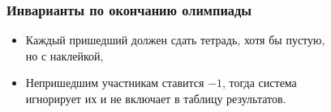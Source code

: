\documentclass[aspectratio=1610,12pt,notheorems]{beamer}
\begin{document}
\begin{frame} \frametitle{Инварианты по окончанию олимпиады}
\begin{itemize}
	\item Каждый пришедший должен сдать тетрадь, хотя бы пустую, \\
	но с наклейкой, \medskip
	\item Непришедшим участникам ставится $-1$, тогда система \\
	игнорирует их и не включает в таблицу результатов. \medskip
\end{itemize}
\end{frame}
\end{document}
